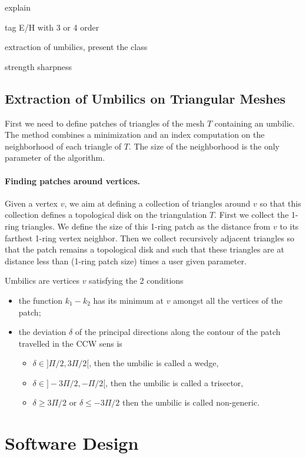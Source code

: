 explain

tag E/H with 3 or 4 order

extraction of umbilics, present the class 

strength sharpness

\subsection{Extraction of Umbilics on Triangular Meshes}

First we need to define patches of triangles of the mesh $T$
containing an umbilic.  The method combines a minimization and an
index computation on the neighborhood of each triangle of $T$. The
size of the neighborhood is the only parameter of the algorithm.

\paragraph{Finding patches around vertices.}
Given a vertex $v$, we aim at defining a collection of triangles
around $v$ so that this collection defines a topological disk on the
triangulation $T$. First we collect the 1-ring triangles. We define
the size of this 1-ring patch as the distance from $v$ to its farthest
1-ring vertex neighbor. Then we collect recursively adjacent triangles
so that the patch remains a topological disk and such that these
triangles are at distance less than (1-ring patch size) times a user
given parameter.

Umbilics are vertices $v$ satisfying the 2 conditions
\begin{itemize}
\item
the function $k_1-k_2$ has its minimum at $v$ amongst all the
vertices of the patch;
\item
the deviation $\delta$ of the principal directions along the contour
of the patch travelled in the CCW sens is
\begin{itemize}
\item
$\delta \in ]\Pi/2,3\Pi/2[$, then the umbilic is called a wedge,
\item
$\delta \in ]-3\Pi/2,-\Pi/2[$, then the umbilic is called a trisector,
\item
$\delta \geq 3\Pi/2$ or $\delta \leq -3\Pi/2$ then the umbilic is called non-generic.
\end{itemize}
\end{itemize}

\section{Software Design}

